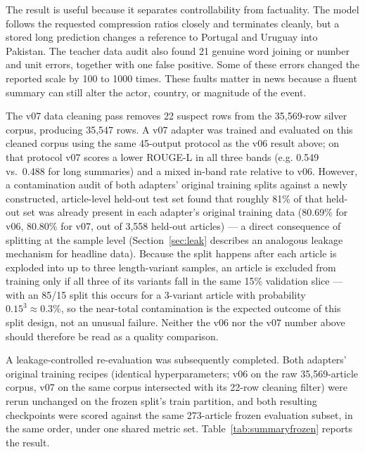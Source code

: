 \documentclass[a4paper,conference]{IEEEtran}
\begin{document}
The result is useful because it separates controllability from factuality. The
model follows the requested compression ratios closely and terminates cleanly,
but a stored long prediction changes a reference to Portugal and Uruguay into Pakistan.
The teacher data audit also found 21 genuine word joining or number and unit
errors, together with one false positive. Some of these errors changed the
reported scale by 100 to 1000 times. These faults matter in news because a fluent summary can still alter the
actor, country, or magnitude of the event.

The v07 data cleaning pass removes 22 suspect rows from the 35,569-row silver
corpus, producing 35,547 rows. A v07 adapter was trained and evaluated on
this cleaned corpus using the same 45-output protocol as the v06 result
above; on that protocol v07 scores a lower ROUGE-L in all three bands (e.g.
0.549 vs.\ 0.488 for long summaries) and a mixed in-band rate relative to
v06. However, a contamination audit of both adapters' original training
splits against a newly constructed, article-level held-out test set found
that roughly 81\% of that held-out set was already present in each
adapter's original training data (80.69\% for v06, 80.80\% for v07, out of
3,558 held-out articles) — a direct consequence of splitting at the
sample level (Section~\ref{sec:leak} describes an analogous leakage
mechanism for headline data). Because the split happens after each article
is exploded into up to three length-variant samples, an article is excluded
from training only if all three of its variants fall in the same 15\%
validation slice — with an 85/15 split this occurs for a 3-variant article
with probability $0.15^3 \approx 0.3\%$, so the near-total contamination is
the expected outcome of this split design, not an unusual failure. Neither
the v06 nor the v07 number above should therefore be read as a quality
comparison.

A leakage-controlled re-evaluation was subsequently completed. Both
adapters' original training recipes (identical hyperparameters; v06 on the
raw 35,569-article corpus, v07 on the same corpus intersected with its
22-row cleaning filter) were rerun unchanged on the frozen split's train
partition, and both resulting checkpoints were scored against the same
273-article frozen evaluation subset, in the same order, under one shared
metric set. Table~\ref{tab:summaryfrozen} reports the result.
\end{document}
